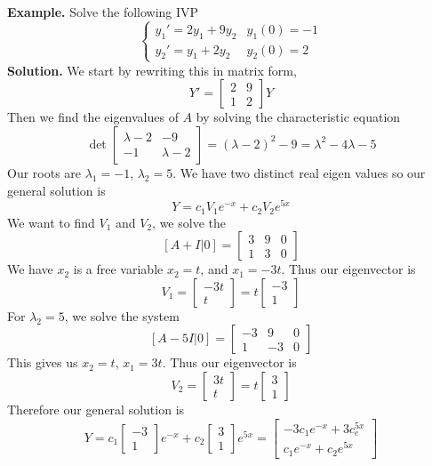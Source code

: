 \documentclass[openany]{report}
\begin{document}
\textbf{Example.} Solve the following IVP 
\[\begin{cases}
    y_1' = 2y_1 + 9y_2 & y_1(0) = -1\\
    y_2' = y_1 + 2y_2 & y_2(0) = 2
\end{cases}\]
\textbf{Solution.} We start by rewriting this in matrix form, 
\[Y' = \begin{bmatrix}
    2 & 9\\
    1 & 2
\end{bmatrix}Y\]
Then we find the eigenvalues of $A$ by solving the characteristic equation
\[\det\begin{bmatrix}
    \lambda - 2 & -9\\
    -1 & \lambda - 2
\end{bmatrix} = (\lambda - 2)^2 - 9 = \lambda^2 - 4\lambda - 5\]
Our roots are $\lambda_1 = -1$, $\lambda_2 = 5$. We have two distinct real eigen values so our general solution is
\[Y = c_1V_1e^{-x} + c_2V_2e^{5x}\]
We want to find $V_1$ and $V_2$, we solve the 
\[[A + I| 0] = \begin{bmatrix}
    3 & 9 & 0\\
    1 & 3 & 0
\end{bmatrix}\]
We have $x_2$ is a free variable $x_2 = t$, and $x_1 = -3t$. Thus our eigenvector is 
\[V_1 = \begin{bmatrix}
    -3t\\
    t
\end{bmatrix} = t\begin{bmatrix}
    -3\\
    1
\end{bmatrix}\]
For $\lambda_2 = 5$, we solve the system
\[[A - 5I|0] = \begin{bmatrix}
    -3 & 9 & 0\\
    1 & -3 & 0
\end{bmatrix}\]
This gives us $x_2 = t$, $x_1 = 3t$. Thus our eigenvector is
\[V_2 = \begin{bmatrix}
    3t\\
    t
\end{bmatrix} = t\begin{bmatrix}
    3\\
    1
\end{bmatrix}\]
Therefore our general solution is
\[Y = c_1\begin{bmatrix}
    -3\\
    1
\end{bmatrix}e^{-x} + c_2\begin{bmatrix}
    3\\
    1
\end{bmatrix}e^{5x} = \begin{bmatrix}
    -3c_1e^{-x} + 3c_e^{5x}\\
    c_1e^{-x} + c_2e^{5x}
\end{bmatrix}\]
\end{document}
